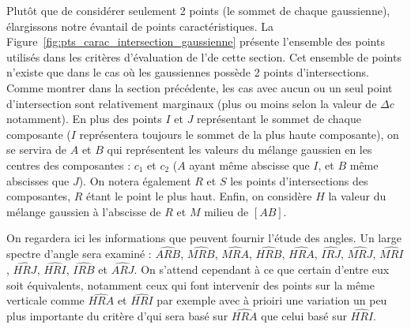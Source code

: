 \documentclass[main.tex]{subfiles}
\begin{document}
Plutôt que de considérer seulement 2 points (le sommet de chaque gaussienne), élargissons notre évantail de points caractéristiques. La Figure~\ref{fig:pts_carac_intersection_gaussienne} présente l'ensemble des points utilisés dans les critères d'évaluation de l'\hetero de cette section. Cet ensemble de points n'existe que dans le cas où les gaussiennes possède 2 points d'intersections. Comme montrer dans la section précédente, les cas avec aucun ou un seul point d'intersection sont relativement marginaux (plus ou moins selon la valeur de $\Delta c$ notamment). En plus des points $I$ et $J$ représentant le sommet de chaque composante ($I$ représentera toujours le sommet de la plus haute composante), on se servira de $A$ et $B$ qui représentent les valeurs du mélange gaussien en les centres des composantes : $c_1$ et $c_2$ ($A$ ayant même abscisse que $I$, et $B$ même abscisses que $J$). On notera également $R$ et $S$ les points d'intersections des composantes, $R$ étant le point le plus haut. Enfin, on considère $H$ la valeur du mélange gaussien à l'abscisse de $R$ et $M$ milieu de $[AB]$. 


On regardera ici les informations que peuvent fournir l'étude des angles. Un large spectre d'angle sera examiné : $\widehat{ARB}$, $\widehat{MRB}$, $\widehat{MRA}$,  $\widehat{HRB}$, $\widehat{HRA}$, $\widehat{IRJ}$, $\widehat{MRJ}$, $\widehat{MRI}$, $\widehat{HRJ}$, $\widehat{HRI}$, $\widehat{IRB}$ et $\widehat{ARJ}$. 
On s'attend cependant à ce que certain d'entre eux soit équivalents, notamment ceux qui font intervenir des points sur la même verticale comme $\widehat{HRA}$ et $\widehat{HRI}$ par exemple avec à prioiri une variation un peu plus importante du critère d'\hetero qui sera basé sur $\widehat{HRA}$ que celui basé sur $\widehat{HRI}$.
\end{document}
